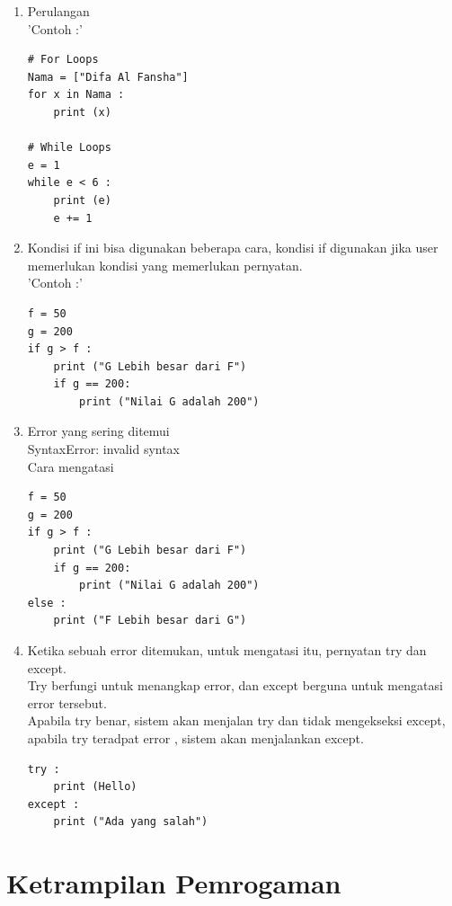 \begin{enumerate}
\item Perulangan\\
'Contoh :'
\begin{verbatim}
# For Loops
Nama = ["Difa Al Fansha"]
for x in Nama :
    print (x)
    
# While Loops
e = 1
while e < 6 :
    print (e)
    e += 1
\end{verbatim}

\item Kondisi if  ini bisa digunakan beberapa cara, kondisi if digunakan jika user memerlukan kondisi yang memerlukan pernyatan.\\
'Contoh :'
\begin{verbatim}
f = 50
g = 200
if g > f :
    print ("G Lebih besar dari F")
    if g == 200:
        print ("Nilai G adalah 200")
\end{verbatim}

\item Error yang sering ditemui\\
SyntaxError: invalid syntax\\
Cara mengatasi\\
\begin{verbatim}
f = 50
g = 200
if g > f :
    print ("G Lebih besar dari F")
    if g == 200:
        print ("Nilai G adalah 200")
else :
    print ("F Lebih besar dari G")
\end{verbatim}

\item Ketika sebuah error ditemukan, untuk mengatasi itu, pernyatan try dan except.\\
Try berfungi untuk menangkap error, dan except berguna untuk mengatasi error tersebut.\\
Apabila try benar, sistem akan menjalan try dan tidak mengekseksi except, apabila try teradpat error , sistem akan menjalankan except.\\
\begin{verbatim}
try :
    print (Hello)
except :
    print ("Ada yang salah")
\end{verbatim}
\end{enumerate}

\section{Ketrampilan Pemrogaman}

